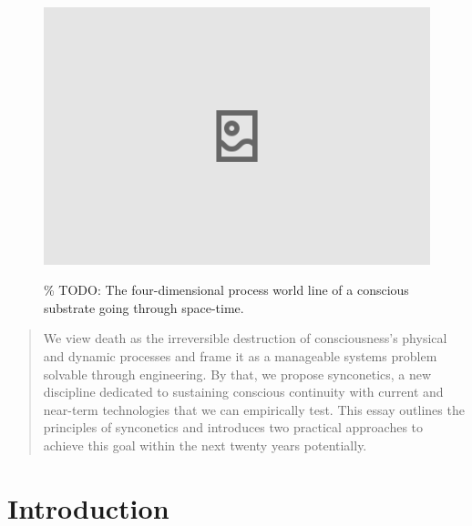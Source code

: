 \documentclass[10pt]{article}
\begin{document}
\begin{sloppypar}

  \begin{figure}[ht]
    \centering
    \includegraphics[width=\textwidth]{figures/cover.png}
    \label{fig:cover}
    \caption{\% TODO: The four-dimensional process world line of a conscious substrate going through space-time.}
  \end{figure}
  \newpage



  \begin{abstract}
    We view death as the irreversible destruction of consciousness’s physical and dynamic processes and frame it as a manageable systems problem solvable through engineering. By that, we propose synconetics, a new discipline dedicated to sustaining conscious continuity with current and near-term technologies that we can empirically test. This essay outlines the principles of synconetics and introduces two practical approaches to achieve this goal within the next twenty years potentially.
  \end{abstract}

  \pagebreak
  \tableofcontents
  \pagebreak
  \listoffigures
  \pagebreak


  \section{Introduction}
  \label{sec:introduction}


\end{sloppypar}
\end{document}
